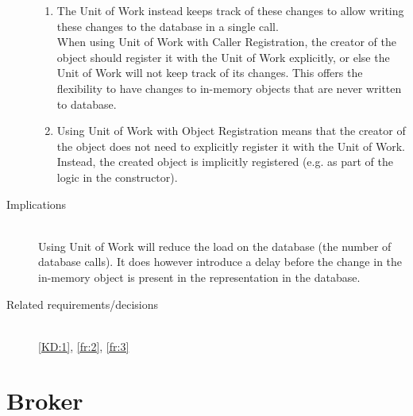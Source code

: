 \begin{description}
\begin{enumerate}
\item The Unit of Work instead keeps track of these changes to allow writing these changes to the database in a single call.\\ When using Unit of Work with Caller Registration, the creator of the object should register it with the Unit of Work explicitly, or else the Unit of Work will not keep track of its changes. This offers the flexibility to have changes to in-memory objects that are never written to database. 

\item Using Unit of Work with Object Registration means that the creator of the object does not need to explicitly register it with the Unit of Work. Instead, the created object is implicitly registered (e.g. as part of the logic in the constructor). 
\end{enumerate}

\item [Implications]~\\
Using Unit of Work will reduce the load on the database (the number of database calls). It does however introduce a delay before the change in the in-memory object is present in the representation in the database.

\item [Related requirements/decisions]~\\
\ref{KD:1}, \ref{fr:2}, \ref{fr:3}

\end{description}

\section{Broker}


